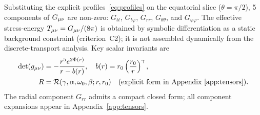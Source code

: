 Substituting the explicit profiles~\eqref{eq:profiles} on the equatorial slice ($\theta=\pi/2$), 5 components of $G_{\mu\nu}$ are non-zero: $G_{tt}$, $G_{t\varphi}$, $G_{rr}$, $G_{\theta\theta}$, and $G_{\varphi\varphi}$.
The effective stress-energy $T_{\mu\nu}=G_{\mu\nu}/(8\pi)$ is obtained by symbolic differentiation as a static background constraint (criterion~C2); it is not assembled dynamically from the discrete-transport analysis.
Key scalar invariants are
\begin{align}
\det(g_{\mu\nu}) &= -\frac{r^{5} e^{2\Phi(r)}}{r - b(r)}, \quad b(r)=r_{0} \left(\frac{r_{0}}{r}\right)^{\gamma}, \nonumber\\
R &= \mathcal{R}(\gamma,\alpha,\omega_0,\beta;r,r_0)\quad\text{(explicit form in Appendix~\ref{app:tensors})}.
\end{align}
The radial component $G_{rr}$ admits a compact closed form; all component expansions appear in Appendix~\ref{app:tensors}.
